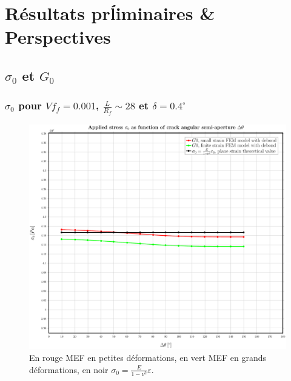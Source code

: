 \documentclass[first,firstsupp,lastsupp,handout,last,hyperref,table]{ETHclass}
\begin{document}
\section[R\'esultats]{R\'esultats pr\'liminaires \& Perspectives}

\subsection{$\sigma_{0}$ et $G_{0}$}

\begin{frame}
\frametitle{\small $\sigma_{0}$ pour $Vf_{f}=0.001$, $\frac{L}{R_{f}}\sim28$ et $\delta=0.4^{\circ}$}
\vspace{-0.5cm}
\centering
\captionsetup[figure]{font=scriptsize,labelfont=scriptsize}
\begin{figure}[!h]
\centering
\includegraphics[height=0.7\textheight]{2017-06-23_AbqRunSummary_SingleFiberEqRfSmallFiniteStrain_sigma-inf_Summary.pdf}
  \caption{\scriptsize En rouge MEF en petites d\'eformations, en vert MEF en grands d\'eformations, en noir $\sigma_{0}=\frac{E}{1-\nu^{2}}\varepsilon$.}
  \label{fig:res1}
\end{figure}
\end{frame}
\end{document}
